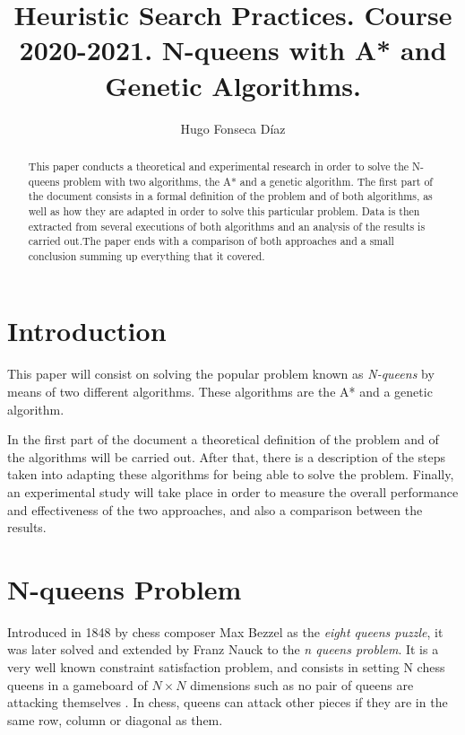 \documentclass[11pt]{llncs}
\begin{document}
\title{Heuristic Search Practices. Course 2020-2021. N-queens with A* and Genetic Algorithms.}
\author{Hugo Fonseca Díaz\\ }
\maketitle
\begin{abstract}
This paper conducts a theoretical and experimental research in order to solve the N-queens problem with two algorithms, the A* and a genetic algorithm. The first part of the document consists in a formal definition of the problem and of both algorithms, as well as how they are adapted in order to solve this particular problem. Data is then extracted from several executions of both algorithms and an analysis of the results is carried out.The paper ends with a comparison of both approaches and a small conclusion summing up everything that it covered. 
\end{abstract}
\section{Introduction}\label{introduction}
This paper will consist on solving the popular problem known as \textit{N-queens} by means of two different algorithms. These algorithms are the A* and a genetic algorithm.

In the first part of the document a theoretical definition of the problem and of the algorithms will be carried out. After that, there is a description of the steps taken into adapting these algorithms for being able to solve the problem. Finally, an experimental study will take place in order to measure the overall performance and effectiveness of the two approaches, and also a comparison between the results.
\section{N-queens Problem}\label{nqueens_problem}
Introduced in 1848 by chess composer Max Bezzel as the \textit{eight queens puzzle}, it was later solved and extended by Franz Nauck to the \textit{n queens problem}. It is a very well known constraint satisfaction problem, and consists in setting N chess queens in a gameboard of $N \times N$ dimensions such as no pair of queens are attacking themselves \cite{inteligencia_artificial}. In chess, queens can attack other pieces if they are in the same row, column or diagonal as them.
\end{document}
